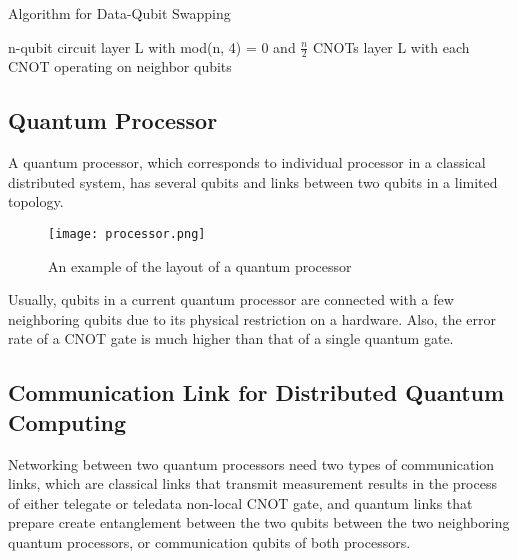 \begin{algorithm}
 \caption{Algorithm for Data-Qubit Swapping}
 \begin{algorithmic}[1]
  \Require n-qubit circuit layer L with mod(n, 4) = 0 and $\frac{n}{2}$ CNOTs
  \Ensure  layer L with each CNOT operating on neighbor qubits
    \Else
    \EndIf
    
    \EndIf
    
\EndFunction

 \end{algorithmic} 
 \end{algorithm}



 \subsection{Quantum Processor}
  A quantum processor, which corresponds to individual processor in a classical distributed system, has several qubits and links between two qubits in a limited topology.
  
  	 \begin{figure}[h]
  		\begin{center}
  			\texttt{[image: processor.png]}
			\caption{An example of the layout of a quantum processor}
			\label{Fig4}
		\end{center}
	\end{figure}
	
Usually, qubits in a current quantum processor are connected with a few neighboring qubits due to its physical restriction on a hardware.  Also, the error rate of a CNOT gate is much higher than that of a single quantum gate.
 
 \subsection{Communication Link for Distributed Quantum Computing}
Networking between two quantum processors need two types of communication links, which are classical links that transmit measurement results in the process of either telegate or teledata non-local CNOT gate, and quantum links that prepare create entanglement between the two qubits between the two neighboring quantum processors, or communication qubits of both processors.    

%
